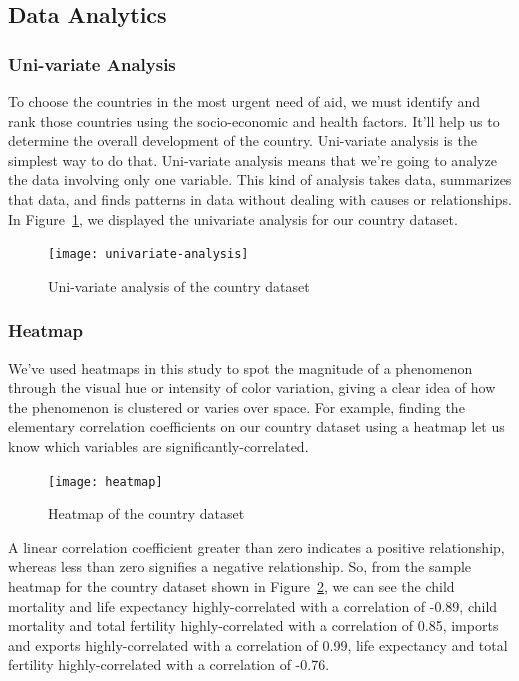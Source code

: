 \documentclass{swfuthesise}
\begin{document}
\subsection{Data Analytics}

\subsubsection{Uni-variate Analysis}

To choose the countries in the most urgent need of aid, we must identify and rank those
countries using the socio-economic and health factors. It'll help us to determine the
overall development of the country. Uni-variate analysis is the simplest way to do
that. Uni-variate analysis means that we're going to analyze the data involving only one
variable. This kind of analysis takes data, summarizes that data, and finds patterns in
data without dealing with causes or relationships. In Figure~\ref{fig:univariate}, we displayed the univariate analysis for our country dataset.

\begin{figure}[!htp]
  \centering \texttt{[image: univariate-analysis]}
  \caption{Uni-variate analysis of the country dataset}
  \label{fig:univariate}
\end{figure}
  

\subsubsection{Heatmap}

We've used heatmaps in this study to spot the magnitude of a phenomenon through the visual hue or intensity of color variation, giving a clear idea of how the phenomenon is clustered or varies over space. For example, finding the elementary correlation coefficients on our country dataset using a heatmap let us know which variables are significantly-correlated.

\begin{figure}[htp]
  \centering \texttt{[image: heatmap]}
  \caption{Heatmap of the country dataset}
  \label{fig:heatmap}
\end{figure}
  
A linear correlation coefficient greater than zero indicates a positive relationship, whereas less than zero signifies a negative relationship. So, from the sample heatmap for the country dataset shown in Figure~\ref{fig:heatmap}, we can see the child mortality and life expectancy highly-correlated with a correlation of -0.89, child mortality and total fertility highly-correlated with a correlation of 0.85, imports and exports highly-correlated with a correlation of 0.99, life expectancy and total fertility highly-correlated with a correlation of -0.76.
\end{document}
